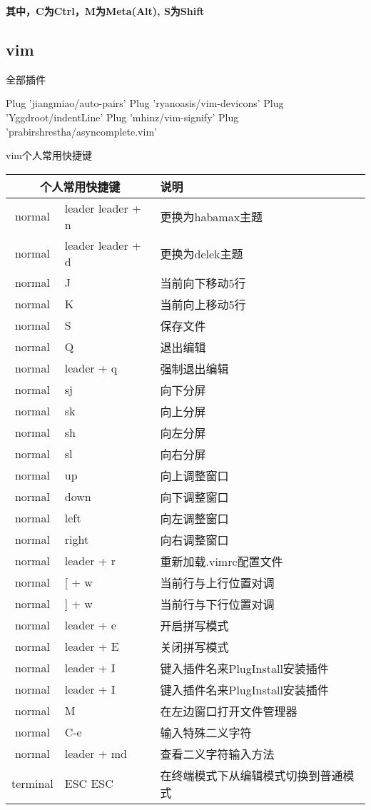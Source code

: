 \documentclass[11pt]{article}
\begin{document}
\begin{flushleft}
\textbf{其中，C为Ctrl，M为Meta(Alt), S为Shift}  
\end{flushleft}

\newpage{}
\subsection{vim}
全部插件 
\begin{code}
  Plug 'jiangmiao/auto-pairs'
  Plug 'ryanoasis/vim-devicons'
  Plug 'Yggdroot/indentLine'
  Plug 'mhinz/vim-signify'
  Plug 'prabirshrestha/asyncomplete.vim'
\end{code}

\begin{flushleft}
  vim个人常用快捷键
\end{flushleft}
\begin{left}
  \begin{tabular}{|c|l|l|}
    \hline
    \multicolumn{2}{|c|}{个人常用快捷键} & 说明 \\ 
    \hline
    normal & leader leader + n & 更换为habamax主题 \\
    normal & leader leader + d & 更换为delek主题 \\
    normal & J & 当前向下移动5行 \\
    normal & K & 当前向上移动5行 \\
    normal & S & 保存文件 \\
    normal & Q & 退出编辑 \\
    normal & leader + q & 强制退出编辑 \\
    normal & sj & 向下分屏 \\
    normal & sk & 向上分屏 \\
    normal & sh & 向左分屏 \\
    normal & sl & 向右分屏 \\
    normal & up & 向上调整窗口 \\
    normal & down & 向下调整窗口 \\
    normal & left & 向左调整窗口 \\
    normal & right & 向右调整窗口 \\
    normal & leader + r & 重新加载.vimrc配置文件 \\
    normal & [ + w & 当前行与上行位置对调 \\ 
    normal & ] + w & 当前行与下行位置对调 \\
    normal & leader + e & 开启拼写模式 \\
    normal & leader + E & 关闭拼写模式 \\
    normal & leader + I & 键入插件名来PlugInstall安装插件 \\
    normal & leader + I & 键入插件名来PlugInstall安装插件 \\
    normal & M & 在左边窗口打开文件管理器 \\
    normal & C-e & 输入特殊二义字符 \\
    normal & leader + md & 查看二义字符输入方法 \\
    terminal & ESC ESC & 在终端模式下从编辑模式切换到普通模式 \\    
    \hline
  \end{tabular}  
\end{left}
\end{document}
